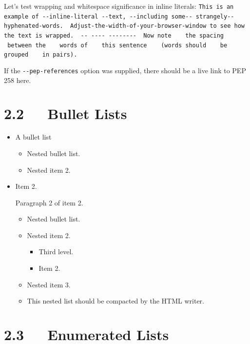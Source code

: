\documentclass[a4paper]{memoir}
\begin{document}

Let's test wrapping and whitespace significance in inline literals:
\texttt{This is an example of -{}-inline-literal -{}-text, -{}-including some-{}-
strangely-{}-hyphenated-words. ~Adjust-the-width-of-your-browser-window
to see how the text is wrapped. ~-{}- -{}-{}-{}- -{}-{}-{}-{}-{}-{}-{}- ~Now note ~ ~the
spacing ~ ~between the ~ ~words of ~ ~this sentence ~ ~(words
should ~ ~be grouped ~ ~in pairs).}

If the \texttt{-{}-pep-references} option was supplied, there should be a
live link to PEP 258 here.


\section{2.2   Bullet Lists}

\begin{itemize}
\item A bullet list

\begin{itemize}
\item Nested bullet list.

\item Nested item 2.
\end{itemize}

\item Item 2.

Paragraph 2 of item 2.

\begin{itemize}
\item Nested bullet list.

\item Nested item 2.

\begin{itemize}
\item Third level.

\item Item 2.
\end{itemize}

\item Nested item 3.

\item This nested list should be compacted by the HTML writer.

\label{target}
\end{itemize}
\end{itemize}


\section{2.3   Enumerated Lists}
\end{document}
